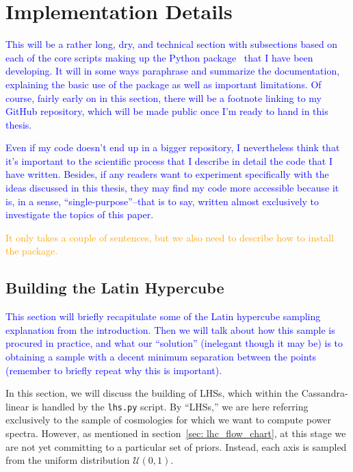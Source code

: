 \chapter{Implementation Details}

\textcolor{blue}{This will be a rather long, dry, and technical section with 
subsections based on each of the core scripts making up the Python package \
that I have been developing. It will in some ways paraphrase and summarize the 
documentation, explaining the basic use of the package as well as important 
limitations. Of course, fairly early on in this section, there will be a 
footnote linking to my GitHub repository, which will be made public once I'm 
ready to hand in this thesis.}

\textcolor{blue}{Even if my code doesn't end up in a bigger repository, I 
nevertheless think that it's important to the scientific process that I 
describe in detail the code that I have written. Besides, if any readers want 
to experiment specifically with the ideas discussed in this thesis, they may 
find my code more accessible because it is, in a sense, ``single-purpose''--that 
is to say, written almost exclusively to investigate the topics of this 
paper.}

\textcolor{orange}{It only takes a couple of sentences, but we also need to 
describe how to install the package.}

\section{Building the Latin Hypercube}
\label{sec: build_lhc}


\textcolor{blue}{This section will briefly recapitulate some of the Latin hypercube sampling
explanation from the introduction. Then we will talk about how this sample is
procured in practice, and what our ``solution'' (inelegant though it may be)
is to obtaining a sample with a decent minimum separation between the points
(remember to briefly repeat why this is important).}

In this section, we will discuss the building of LHSs, which within the
Cassandra-linear is handled by the \verb|lhs.py| script.
By ``LHSs,'' we are here referring exclusively to the
sample of cosmologies for which we want to compute power spectra.
However, as mentioned in section~\ref{sec: lhc_flow_chart}, at this stage we 
are not
yet committing to a particular set of priors. Instead, each axis is sampled
from the uniform distribution $\mathcal{U} (0, 1)$.

